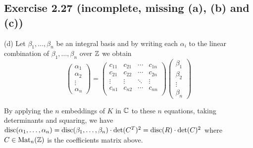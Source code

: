 \documentclass[../Marcus.tex]{subfiles}
\begin{document}
\subsection*{Exercise 2.27 \color{red}(incomplete, missing (a), (b) and (c))}

\begin{comment}
(a) It's enough to show that $G/H$ is a torsion $\ZZ$-module. (Then by the fundamental theorem of finitely generated abelian groups, $G/H$ is finite.) Suppose not, then there exists $g\in G$ s.t. $mg \notin H$ for all $m\in \ZZ \setminus\{0\}$. Write $H = \oplus_{i=1}^n \ZZ h_i$. We check that $\{g,h_1,\ldots,h_n\}$ is linearly independent over $\ZZ$. Suppose $m_0g + \sum_{i=1}^n m_ih_i = 0$ for some $m_i\in \ZZ$. Then since $m_0g \in H$, we must have $m_0 = 0$. And so $m_1=\cdots=m_n=0$. This completes the claim. Consequently, $H \oplus \ZZ g = ( \oplus_{i=1}^n \ZZ h_i ) \oplus \ZZ g \sbe G$ is of rank $n+1$, a contradiction.
\end{comment}

(d) Let $\beta_1,\ldots,\beta_n$ be an integral basis and by writing each $\alpha_i$ to the linear combination of $\beta_1,\ldots,\beta_n$ over $\mathbb{Z}$ we obtain
$$
\begin{pmatrix}
    \alpha_1  \\
    \alpha_2 \\
    \vdots \\
    \alpha_n
\end{pmatrix}
=
\begin{pmatrix}
    c_{11}  & c_{21} & \cdots & c_{1n} \\
    c_{21} & c_{22} & \cdots & c_{2n} \\
    \vdots & \vdots  & \ddots & \vdots \\
    c_{n1} & c_{n2} & \cdots & c_{nn} \\
\end{pmatrix}
\begin{pmatrix}
    \beta_1 \\
    \beta_2 \\
    \vdots \\
    \beta_n
\end{pmatrix}
$$

By applying the $n$ embeddings of $K$ in $\mathbb{C}$ to these $n$ equations, taking determinants and squaring, we have $\operatorname{disc}(\alpha_1,\ldots,\alpha_n)=\operatorname{disc}(\beta_1,\ldots,\beta_n)\cdot \det(C^T)^2=\operatorname{disc}(R)\cdot \det(C)^2$ where $C\in\operatorname{Mat}_n(\mathbb{Z})$ is the coefficients matrix above.
\end{document}
